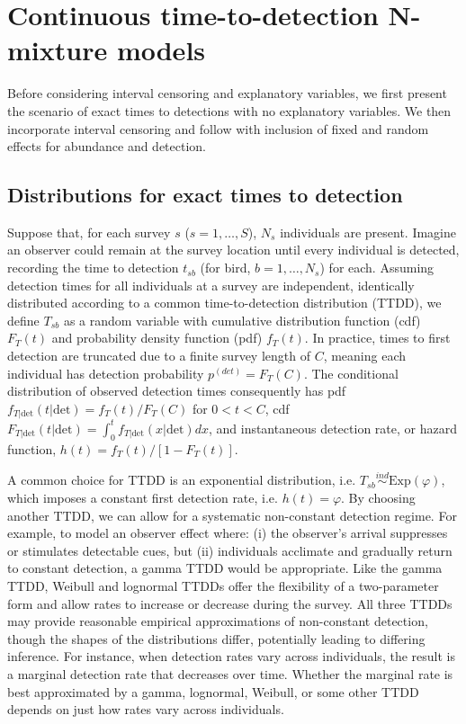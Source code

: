 \documentclass[12pt]{article}
\newcommand{\pdet}{p^{(det)}}
\newcommand{\ind}{\stackrel{ind}{\sim}}
\newcommand{\dt}{\text{det}}
\newcommand{\ftdt}{f_{T|\dt}(t|\dt)}
\begin{document}
\section{Continuous time-to-detection N-mixture models} \label{sec:model}

Before considering interval censoring and explanatory variables, we first present the scenario of exact times to detections with no explanatory variables. 
We then incorporate interval censoring and follow with inclusion of fixed and random effects for abundance and detection. 

\subsection{Distributions for exact times to detection}\label{sec:exact_time}

Suppose that, for each survey $s$ ($s=1,\dots,S$), $N_s$ individuals are present.  
Imagine an observer could remain at the survey location until every individual is detected, recording the time to detection $t_{sb}$ (for bird, $b=1,\dots,N_s$) for each.
Assuming detection times for all individuals at a survey are independent, identically distributed according to a common time-to-detection distribution (TTDD), we define $T_{sb}$ as a random variable with cumulative distribution function (cdf) $F_T(t)$ and probability density function (pdf) $f_T(t)$.
In practice, times to first detection are truncated due to a finite survey length of $C$, meaning each individual has detection probability $\pdet=F_T(C)$.  
The conditional distribution of observed detection times consequently has pdf $\ftdt= f_T(t)/F_T(C)$ for $0<t<C$, cdf $F_{T|\dt}(t|\dt) = \int_0^t f_{T|\dt}(x|\dt) dx$, and instantaneous detection rate, or hazard function, $h(t) = f_T(t) / [1-F_T(t)]$. 

A common choice for TTDD is an exponential distribution, i.e. $T_{sb}\ind \mbox{Exp}(\varphi)$, which imposes a constant first detection rate, i.e. $h(t) = \varphi$.
By choosing another TTDD, we can allow for a systematic non-constant detection regime. 
For example, to model an observer effect where: (i) the observer's arrival suppresses or stimulates detectable cues, but (ii) individuals acclimate and gradually return to constant detection, a gamma TTDD would be appropriate.
Like the gamma TTDD, Weibull and lognormal TTDDs offer the flexibility of a two-parameter form and allow rates to increase or decrease during the survey.
All three TTDDs may provide reasonable empirical approximations of non-constant detection, though the shapes of the distributions differ, potentially leading to differing inference.
For instance, when detection rates vary across individuals, the result is a marginal detection rate that decreases over time.
Whether the marginal rate is best approximated by a gamma, lognormal, Weibull, or some other TTDD depends on just how rates vary across individuals.
\end{document}
